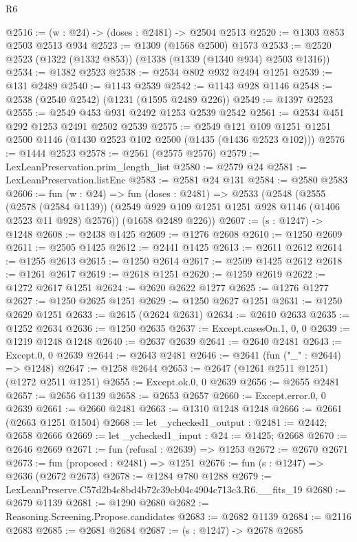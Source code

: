 \begin{lexlean}{R6}
\begin{coremodule}
@2516 := (w : @24) -> (doses : @2481) -> @2504 @2513
@2520 := @1303 @853 @2503 @2513 @934
@2523 := @1309 (@1568 @2500) @1573
@2533 := @2520 @2523 (@1322 (@1332 @853)) (@1338 (@1339 (@1340 @934) @2503 @1316))
@2534 := @1382 @2523
@2538 := @2534 @802 @932 @2494 @1251
@2539 := @131 @2489
@2540 := @1143 @2539
@2542 := @1143 @928 @1146
@2548 := @2538 (@2540 @2542) (@1231 (@1595 @2489 @226))
@2549 := @1397 @2523
@2555 := @2549 @453 @931 @2492 @1253 @2539 @2542
@2561 := @2534 @451 @292 @1253 @2491 @2502 @2539
@2575 := @2549 @121 @109 @1251 @1251 @2500 @1146 (@1430 @2523 @102 @2500 (@1435 (@1436 @2523 @102)))
@2576 := @1444 @2523
@2578 := @2561 (@2575 @2576)
@2579 := LexLeanPreservation.prim_length_list
@2580 := @2579 @24
@2581 := LexLeanPreservation.listEnc
@2583 := @2581 @24 @131
@2584 := @2580 @2583
@2606 := fun (w : @24) =>
  fun (doses : @2481) =>
  @2533
    (@2548
      (@2555
        (@2578 (@2584 @1139))
        (@2549 @929 @109 @1251 @1251 @928 @1146 (@1406 @2523 @11 @928) @2576))
      (@1658 @2489 @226))
@2607 := (s : @1247) -> @1248
@2608 := @2438 @1425
@2609 := @1276 @2608
@2610 := @1250 @2609
@2611 := @2505 @1425
@2612 := @2441 @1425
@2613 := @2611 @2612
@2614 := @1255 @2613
@2615 := @1250 @2614
@2617 := @2509 @1425 @2612
@2618 := @1261 @2617
@2619 := @2618 @1251
@2620 := @1259 @2619
@2622 := @1272 @2617 @1251
@2624 := @2620 @2622 @1277
@2625 := @1276 @1277
@2627 := @1250 @2625 @1251
@2629 := @1250 @2627 @1251
@2631 := @1250 @2629 @1251
@2633 := @2615 (@2624 @2631)
@2634 := @2610 @2633
@2635 := @1252 @2634
@2636 := @1250 @2635
@2637 := Except.casesOn.{1, 0, 0}
@2639 := @1219 @1248 @1248
@2640 := @2637 @2639
@2641 := @2640 @2481
@2643 := Except.{0, 0} @2639
@2644 := @2643 @2481
@2646 := @2641 (fun ("_" : @2644) => @1248)
@2647 := @1258 @2644
@2653 := @2647 (@1261 @2511 @1251) (@1272 @2511 @1251)
@2655 := Except.ok.{0, 0} @2639
@2656 := @2655 @2481
@2657 := @2656 @1139
@2658 := @2653 @2657
@2660 := Except.error.{0, 0} @2639
@2661 := @2660 @2481
@2663 := @1310 @1248 @1248
@2666 := @2661 (@2663 @1251 @1504)
@2668 := let _ychecked1_output : @2481 := @2442; @2658 @2666
@2669 := let _ychecked1_input : @24 := @1425; @2668
@2670 := @2646 @2669
@2671 := fun (refusal : @2639) => @1253
@2672 := @2670 @2671
@2673 := fun (proposed : @2481) => @1251
@2676 := fun (s : @1247) => @2636 (@2672 @2673)
@2678 := @1284 @780 @1288
@2679 := LexLeanPreserve.C57d2b4c8bd4b72c39cb04c4904c713c3.R6.__fits_19
@2680 := @2679 @1139
@2681 := @1290 @2680
@2682 := Reasoning.Screening.Propose.candidates
@2683 := @2682 @1139
@2684 := @2116 @2683
@2685 := @2681 @2684
@2687 := (s : @1247) -> @2678 @2685

\end{coremodule}
\end{lexlean}
